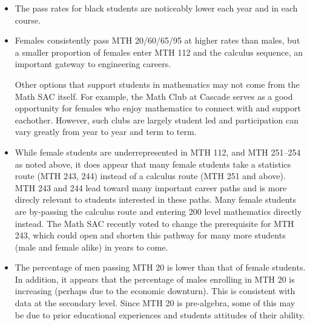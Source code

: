 \begin{itemize}
	some minority students or that minority students place into MTH 20 at a
	disproportionately high rate. Although this is relatively consistent with
	national data, we would like the administration to continue to support
	programs like Passages, Project Independence, ROOTS, and other interventions
	to increase success rates of
	minority students. In addition, a more diverse faculty might help with
	retention and passing rates; \emph{ the extent to which [the instructor's attributes]
		differ from the physical, cultural, and intellectual backgrounds of [his/her] students
		will have a profound effect on the interactions in [the] classroom.}
	\footnote{\url{http://www.crlt.umich.edu/gsis/p3_2}}
	\item The pass rates for black students are noticeably lower each year and
	in each course.

	\item Females consistently pass MTH 20/60/65/95 at higher rates than males,
	but a smaller proportion of females enter MTH 112 and the calculus
	sequence, an important gateway to engineering careers.


	Other options that support students in
	mathematics may not come from the Math SAC itself. For example, the Math
	Club at Cascade serves as a good opportunity for females who enjoy
	mathematics to connect with and support eachother. However, such clubs
	are largely student led and participation can vary greatly from year to
	year and term to term.

	\item While female students are underrepresented in MTH 112, and MTH 251--254
	as noted above, it does appear that many female students take a statistics
	route (MTH 243, 244) instead of a calculus route (MTH 251 and above). MTH 243
	and 244 lead toward many important career paths and is more direcly relevant
	to students interested in these paths. Many female students are by-passing
	the calculus route and entering 200 level mathematics directly instead. The
	Math SAC recently voted to change the prerequisite for MTH 243, which could
	open and shorten this pathway for many more students (male and female alike)
	in years to come.

	\item The percentage of men passing MTH 20 is lower than that of female
	students. In addition, it appears that the percentage of males enrolling
	in MTH 20 is increasing (perhaps due to the economic downturn). This is
	consistent with data at the secondary level. Since MTH 20 is pre-algebra,
	some of this may be due to prior educational experiences and students
	attitudes of their ability.
\end{itemize}

